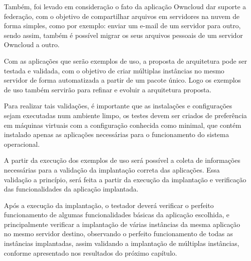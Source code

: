 Também, foi levado em consideração o fato da  aplicação Owncloud dar suporte a federação,
com  o objetivo de compartilhar arquivos em servidores na nuvem de forma simples,
como por exemplo: enviar um e-mail de um servidor para outro, sendo assim,
também é possível migrar os seus arquivos pessoais de um servidor Owncloud a outro.

Com as aplicações que serão exemplos de uso, a proposta de arquitetura
pode ser testada e validada, com o objetivo de criar múltiplas instâncias
no mesmo servidor de forma automatizada a partir de um pacote único. Logo os
exemplos de uso também servirão para refinar e evoluir a arquitetura proposta.

Para realizar tais validações, é importante que as instalações e configurações
sejam executadas num ambiente limpo, os testes devem ser criados de preferência
em máquinas virtuais com a configuração conhecida como minimal, que contém
instalado apenas as aplicações necessárias para o funcionamento do sistema operacional.

A partir da execução dos exemplos de uso será possível a coleta de informações
necessárias para a validação da implantação correta das aplicações. Essa
validação a princípio, será feita a partir da execução da implantação e
verificação das funcionalidades da aplicação implantada.

Após a execução da implantação, o testador deverá verificar o perfeito
funcionamento de algumas funcionalidades básicas da aplicação escolhida,
e principalmente verificar a implantação de várias instâncias da mesma
aplicação no mesmo servidor destino, observando o perfeito funcionamento de todas as
instâncias implantadas, assim validando a implantação de múltiplas instâncias, conforme
apresentado nos resultados do próximo capítulo.
